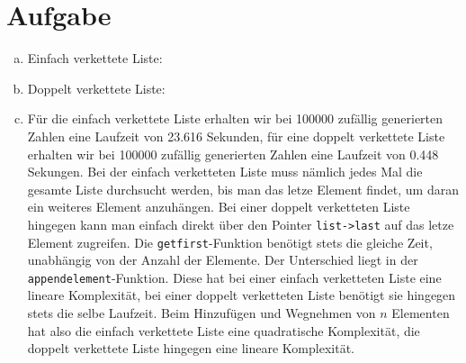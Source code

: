 \documentclass{article}
\begin{document}
\section*{Aufgabe}
\begin{enumerate}[(a)]
    \item Einfach verkettete Liste: 
    \item Doppelt verkettete Liste: 
    \item Für die einfach verkettete Liste erhalten wir bei 100000 zufällig generierten Zahlen eine Laufzeit von 23.616 Sekunden, für eine doppelt verkettete Liste erhalten wir bei 100000 zufällig generierten Zahlen eine Laufzeit von 0.448 Sekungen. Bei der einfach verketteten Liste muss nämlich jedes Mal die gesamte Liste durchsucht werden, bis man das letze Element findet, um daran ein weiteres Element anzuhängen. Bei einer doppelt verketteten Liste hingegen kann man einfach direkt über den Pointer \lstinline{list->last} auf das letze Element zugreifen.
    Die \lstinline{getfirst}-Funktion benötigt stets die gleiche Zeit, unabhängig von der Anzahl der Elemente. Der Unterschied liegt in der \lstinline{appendelement}-Funktion. Diese hat bei einer einfach verketteten Liste eine lineare Komplexität, bei einer doppelt verketteten Liste benötigt sie hingegen stets die selbe Laufzeit.
    Beim Hinzufügen und Wegnehmen von $n$ Elementen hat also die einfach verkettete Liste eine quadratische Komplexität, die doppelt verkettete Liste hingegen eine lineare Komplexität.
\end{enumerate}
\end{document}

